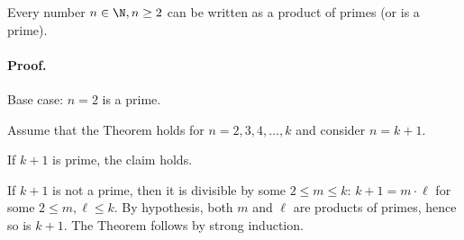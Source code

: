 \begin{example}
\begin{theorem}
Every number $n\in\N, n\geq 2$ can be written as a product of primes (or is a prime).
\end{theorem}

\paragraph{Proof.}
Base case: $n=2$ is a prime.

Assume that the Theorem holds for $n=2,3,4,\ldots, k$ and consider $n=k+1$.

If $k+1$ is prime, the claim holds.

If $k+1$ is not a prime, then it is divisible by some $2 \leq m \leq k$: $k+1=m\cdot \ell$ for some $2 \leq m,\ell\leq k$.
By hypothesis, both $m$ and $\ell$ are products of primes, hence so is $k+1$.
The Theorem follows by strong induction.
\end{example}




